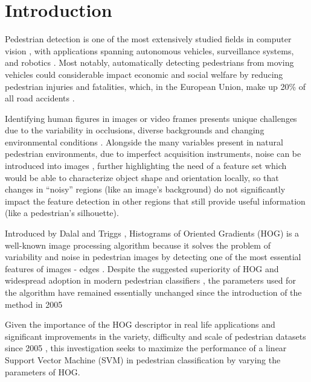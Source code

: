 \section{Introduction}\label{sec:introduction}
Pedestrian detection is one of the most extensively studied fields in computer vision \cite{dollar_2012_pedestrian}, with applications spanning autonomous vehicles, surveillance systems, and robotics \cite{dollar_2012_pedestrian}. Most notably, automatically detecting pedestrians from moving vehicles could considerable impact economic and social welfare by reducing pedestrian injuries and fatalities, which, in the European Union, make up 20\% of all road accidents \cite{slootmans_2021_european}.

Identifying human figures in images or video frames presents unique challenges due to the variability in occlusions, diverse backgrounds and changing environmental conditions \cite{dollar_2012_pedestrian}. Alongside the many variables present in natural pedestrian environments, due to imperfect acquisition instruments, noise can be introduced into images \cite{faraji_2006_ccd}, further highlighting the need of a feature set which would be able to characterize object shape and orientation locally, so that changes in “noisy” regions (like an image’s background) do not significantly impact the feature detection in other regions that still provide useful information (like a pedestrian’s silhouette).

Introduced by Dalal and Triggs \cite{dalal_2005_histograms}, Histograms of Oriented Gradients (HOG) is a well-known \cite{dollar_2012_pedestrian} image processing algorithm because it solves the problem of variability and noise in pedestrian images by detecting one of the most essential features of images - edges \cite{niebles2012edge} \cite{dalal_2005_histograms}. Despite the suggested superiority of HOG \cite{dalal_2005_histograms} and widespread adoption in modern pedestrian classifiers \cite{dollar_2012_pedestrian}, the parameters used for the algorithm have remained essentially unchanged since the introduction of the method in 2005 \cite{dalal_2005_histograms}

Given the importance of the HOG descriptor in real life applications and significant improvements in the variety, difficulty and scale of pedestrian datasets since 2005 \cite{dollar_2012_pedestrian}, this investigation seeks to maximize the performance of a linear Support Vector Machine (SVM) in pedestrian classification by varying the parameters of HOG.